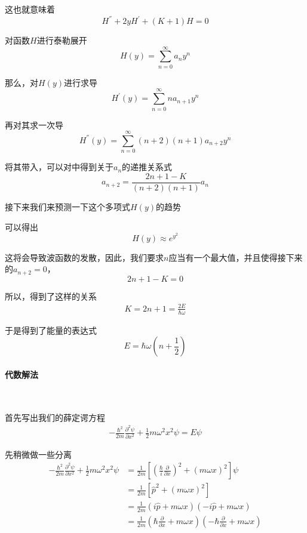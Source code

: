 \documentclass{article}
\begin{document}
这也就意味着
\[H^{''}+2yH^{'}+(K+1)H=0\]

对函数$H$进行泰勒展开
\[
	H(y)=\sum_{n=0}^{\infty}a_ny^n
\]

那么，对$H(y)$进行求导
\[
	H^{'}(y)=\sum_{n=0}^{\infty}na_{n+1}y^{n}
\]

再对其求一次导
\[
	H^{''}(y)=\sum_{n=0}^{\infty}(n+2)(n+1)a_{n+2}y^{n}
\]

将其带入，可以对中得到关于$a_n$的递推关系式
\[a_{n+2}=\frac{2n+1-K}{(n+2)(n+1)}a_n\]

接下来我们来预测一下这个多项式$H(y)$的趋势

可以得出
\[H(y)\approx e^{y^2}\]

这将会导致波函数的发散，因此，我们要求$n$应当有一个最大值，并且使得接下来的$a_{n+2}=0$，
\[2n+1-K=0\]

所以，得到了这样的关系
\begin{align*}
	K=2n+1=\frac{2E}{\hbar\omega}
\end{align*}

于是得到了能量的表达式
\[
	E=\hbar\omega(n+\frac{1}{2})
\]

\paragraph{代数解法}\

首先写出我们的薛定谔方程
\begin{align*}
	-\frac{\hbar^2}{2m}\frac{\partial^2\psi}{\partial x^2}+\frac{1}{2}m\omega^2x^2\psi=E\psi
\end{align*}




先稍微做一些分离
\begin{align*}
	-\frac{\hbar^2}{2m}\frac{\partial^2\psi}{\partial x^2}+\frac{1}{2}m\omega^2x^2\psi & =\frac{1}{2m}\left[\left(\frac{\hbar}{i}\frac{\partial}{\partial x}\right)^2+(m\omega x)^2\right]\psi                        \\
	                                                                                   & =\frac{1}{2m}\left[\hat{p}^2+(m\omega x)^2\right]                                                                            \\
	                                                                                   & =\frac{1}{2m}(i\hat{p}+m\omega x)(-i\hat{p}+m\omega x)                                                                       \\
	                                                                                   & =\frac{1}{2m}\left(\hbar\frac{\partial}{\partial x}+m\omega x\right)\left(-\hbar\frac{\partial}{\partial x}+m\omega x\right)
\end{align*}
\end{document}
